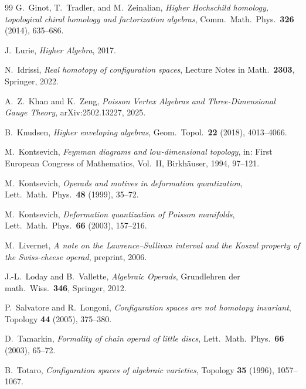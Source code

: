 \documentclass[11pt,reqno]{amsart}
\theoremstyle{definition}
\theoremstyle{remark}
\begin{document}
\begin{thebibliography}{99}
 G.~Ginot, T.~Tradler, and M.~Zeinalian,
 \emph{Higher Hochschild homology, topological chiral homology
 and factorization algebras}, Comm.\ Math.\ Phys.\
 \textbf{326} (2014), 635--686.

 J.~Lurie, \emph{Higher Algebra}, 2017.

 N.~Idrissi, \emph{Real homotopy of configuration
 spaces}, Lecture Notes in Math.\ \textbf{2303}, Springer, 2022.

 A.~Z.~Khan and K.~Zeng, \emph{Poisson Vertex
 Algebras and Three-Dimensional Gauge Theory}, arXiv:2502.13227, 2025.

 B.~Knudsen, \emph{Higher enveloping algebras},
 Geom.\ Topol.\ \textbf{22} (2018), 4013--4066.

 M.~Kontsevich, \emph{Feynman diagrams and
 low-dimensional topology}, in: First European Congress of
 Mathematics, Vol.~II, Birkh\"auser, 1994, 97--121.

 M.~Kontsevich, \emph{Operads and motives in deformation
 quantization}, Lett.\ Math.\ Phys.\ \textbf{48} (1999), 35--72.

 M.~Kontsevich, \emph{Deformation quantization of
 Poisson manifolds}, Lett.\ Math.\ Phys.\ \textbf{66} (2003), 157--216.

 M.~Livernet, \emph{A note on the Lawrence--Sullivan
 interval and the Koszul property of the Swiss-cheese operad},
 preprint, 2006.

 J.-L.~Loday and B.~Vallette, \emph{Algebraic Operads},
 Grundlehren der math.\ Wiss.\ \textbf{346}, Springer, 2012.

 P.~Salvatore and R.~Longoni,
 \emph{Configuration spaces are not homotopy invariant},
 Topology \textbf{44} (2005), 375--380.

 D.~Tamarkin, \emph{Formality of chain operad of
 little discs}, Lett.\ Math.\ Phys.\ \textbf{66} (2003), 65--72.

 B.~Totaro, \emph{Configuration spaces of algebraic
 varieties}, Topology \textbf{35} (1996), 1057--1067.
\end{thebibliography}
\end{document}
